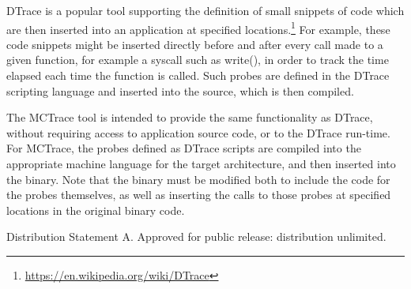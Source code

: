 DTrace is a popular tool supporting the definition of small snippets of code which are then inserted into an application at specified locations.\footnote{\url{https://en.wikipedia.org/wiki/DTrace}}  For example, these code snippets might be inserted directly before and after every call made to a given function, for example a syscall such as write(), in order to track the time elapsed each time the function is called.  Such probes are defined in the DTrace scripting language and inserted into the source, which is then compiled.

The MCTrace tool is intended to provide the same functionality as DTrace, without requiring access to application source code, or to the DTrace run-time.  For MCTrace, the probes defined as DTrace scripts are  compiled into the appropriate machine language for the target architecture, and then inserted into the binary.  Note that the binary must be modified both to include the code for the probes themselves, as well as inserting the calls to those probes at specified locations in the original binary code.

\vspace{0.25in}

\noindent\small{Distribution Statement A. Approved for public release: distribution unlimited.}

  
